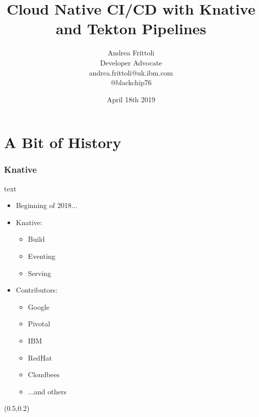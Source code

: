 \documentclass[aspectratio=169,11pt,hyperref={colorlinks=true}]{beamer}
\title{Cloud Native CI/CD with Knative and Tekton Pipelines}
\date[devoxxfr]{April 18th 2019}
\author[Andrea]{
  Andrea Frittoli \\
  Developer Advocate \\
  andrea.frittoli@uk.ibm.com \\
  @blackchip76
}
\institute[devoxxfr]{
  Devoxx France, 8ème édition
}
\begin{document}
\begin{frame}[noframenumbering]
\titlepage{}
\end{frame}



\section{A Bit of History}

\begin{lblackrwhiteframe}
  \frametitle{Knative}
  \large
  \begin{beamercolorbox}[wd=0.3\paperwidth]{text}
    \begin{itemize}
      \item Beginning of 2018...
      \item Knative:
      \begin{itemize}
        \item Build
        \item Eventing
        \item Serving
      \end{itemize}
    \end{itemize}
    \begin{itemize}
      \item Contributors:
      \begin{itemize}
        \item Google
        \item Pivotal
        \item IBM
        \item RedHat
        \item Cloudbees
        \item ...and others
      \end{itemize}
    \end{itemize}
  \end{beamercolorbox}%
  \begin{textblock*}{0.5\paperwidth}(0.5\paperwidth,0.2\paperheight)
    \centering

\end{textblock*}
\end{lblackrwhiteframe}
\end{document}
